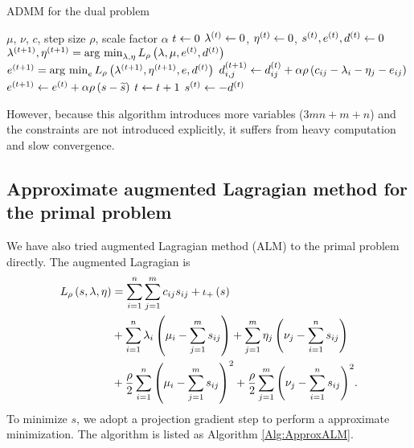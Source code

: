 \documentclass[english]{pkupaper}
\begin{document}
\begin{algorithm}
\caption{ADMM for the dual problem}
\label{Alg:ADMMDual}
\begin{algorithmic}
\REQUIRE $\mu$, $\nu$, $c$, step size $\rho$, scale factor $\alpha$
\STATE $ t \leftarrow 0 $
\STATE $ \lambda^{\left( t \right)} \leftarrow 0 $, $ \eta^{\left( t \right)} \leftarrow 0 $, $ s^{\left( t \right)}, e^{\left( t \right)}, d^{\left( t \right)} \leftarrow 0 $
\STATE $ \lambda^{\left(  t + 1  \right)}, \eta^{\left(  t + 1  \right)} = \operatorname*{\arg\,\min}_{ \lambda, \eta } L_{\rho} \left(  \lambda, \mu, e^{\left( t \right)}, d^{\left( t \right)}  \right) $
\STATE $ e^{\left(  t + 1  \right)} = \operatorname*{\arg\,\min}_e L_{\rho} \left(  \lambda^{\left(  t + 1  \right)}, \eta^{\left(  t + 1  \right)}, e, d^{\left( t \right)}  \right) $
\STATE $ d^{\left(  t + 1  \right)}_{ i, j } \leftarrow d^{\left( t \right)}_{ i j } + \alpha \rho \left(  c_{ i j } - \lambda_i - \eta_j - e_{ i j }  \right) $
\STATE $ e^{\left(  t + 1  \right)} \leftarrow e^{\left( t \right)} + \alpha \rho \left(  s - \widetilde{s}  \right) $
\STATE $ t \leftarrow t + 1 $
\ENDWHILE
\STATE $ s^{\left( t \right)} \leftarrow -d^{\left( t \right)} $
\end{algorithmic}
\end{algorithm}

However, because this algorithm introduces more variables ($ 3 m n + m + n $) and the constraints are not introduced explicitly, it suffers from heavy computation and slow convergence.

\subsection{Approximate augmented Lagragian method for the primal problem}

We have also tried augmented Lagragian method (ALM) to the primal problem directly. The augmented Lagragian is
\begin{equation}
\begin{aligned}
L_{\rho} \left(  s, \lambda, \eta  \right) &= \sum_{ {i} = {1} }^{n}{\sum_{ {j} = {1} }^{m}{ c_{ i j } s_{ i j } }} + \iota_+ \left( s \right) \\
&+ \sum_{ {i} = {1} }^{n}{ \lambda_i \left(  \mu_i - \sum_{ {j} = {1} }^{m}{s_{ i j }}  \right) } + \sum_{ {j} = {1} }^{m}{ \eta_j \left(  \nu_j - \sum_{ {i} = {1} }^{n}{s_{ i j }}  \right) } \\
&+ \frac{\rho}{2} \sum_{ {i} = {1} }^{n}{\left(  \mu_i - \sum_{ {j} = {1} }^{m}{s_{ i j }}  \right)^2} + \frac{\rho}{2} \sum_{ {j} = {1} }^{m}{\left(  \nu_j - \sum_{ {i} = {1} }^{n}{s_{ i j }}  \right)^2}. \\
\end{aligned}
\end{equation}
To minimize $s$, we adopt a projection gradient step to perform a approximate minimization. The algorithm is listed as Algorithm \ref{Alg:ApproxALM}.
\end{document}
